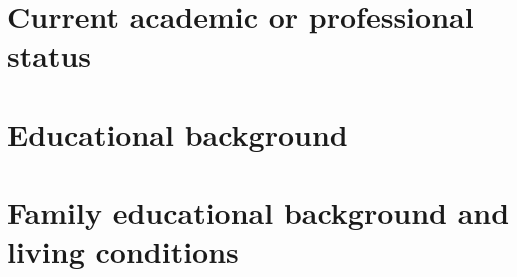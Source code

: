 \documentclass[11pt]{article}
\begin{document}
\section*{Current academic or professional status}






\section*{Educational background}



\section*{Family educational background and living conditions}




\end{document}
